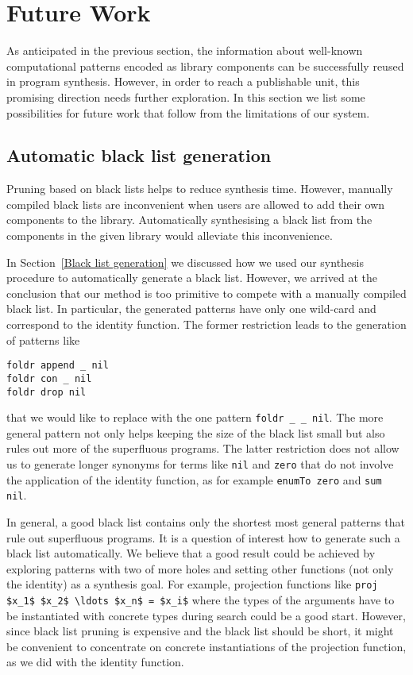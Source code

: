 \section{Future Work}

As anticipated in the previous section, the information about well-known computational patterns encoded as library components can be successfully reused in program synthesis. However, in order to reach a publishable unit, this promising direction needs further exploration. In this section we list some possibilities for future work that follow from the limitations of our system.

\subsection{Automatic black list generation}
Pruning based on black lists helps to reduce synthesis time. However, manually compiled black lists are inconvenient when users are allowed to add their own components to the library. Automatically synthesising a black list from the components in the given library would alleviate this inconvenience.

In Section~\ref{Black list generation} we discussed how we used our synthesis procedure to automatically generate a black list. However, we arrived at the conclusion that our method is too primitive to compete with a manually compiled black list. In particular, the generated patterns have only one wild-card and correspond to the identity function. The former restriction leads to the generation of patterns like
\begin{lstlisting}[style=plain]
foldr append _ nil
foldr con _ nil
foldr drop nil
\end{lstlisting}
that we would like to replace with the one pattern \lstinline!foldr _ _ nil!. The more general pattern not only helps keeping the size of the black list small but also rules out more of the superfluous programs.
The latter restriction does not allow us to generate longer synonyms for terms like \lstinline!nil! and \lstinline!zero! that do not involve the application of the identity function, as for example \lstinline!enumTo zero! and \lstinline!sum nil!.

In general, a good black list contains only the shortest most general patterns that rule out superfluous programs. It is a question of interest how to generate such a black list automatically. We believe that a good result could be achieved by exploring patterns with two of more holes and setting other functions (not only the identity) as a synthesis goal. For example, projection functions like \lstinline!proj $x_1$ $x_2$ \ldots $x_n$ = $x_i$! where the types of the arguments have to be instantiated with concrete types during search could be a good start. However, since black list pruning is expensive and the black list should be short, it might be convenient to concentrate on concrete instantiations of the projection function, as we did with the identity function.


